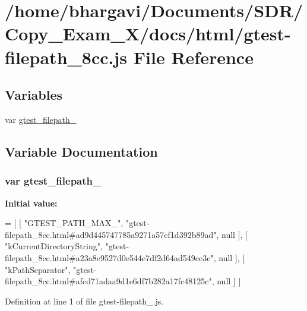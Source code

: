 \hypertarget{gtest-filepath__8cc_8js}{}\section{/home/bhargavi/\+Documents/\+S\+D\+R/\+Copy\+\_\+\+Exam\+\_\+X/docs/html/gtest-\/filepath\+\_\+8cc.js File Reference}
\label{gtest-filepath__8cc_8js}
\subsection*{Variables}
\begin{DoxyCompactItemize}
\item 
var \hyperlink{gtest-filepath__8cc_8js_adc99b293547c19d57955ad8b8722500a}{gtest\+\_\+filepath\+\_}
\end{DoxyCompactItemize}


\subsection{Variable Documentation}
\subsubsection[{\texorpdfstring{gtest\+\_\+filepath\+\_\+8cc}{gtest_filepath_8cc}}]{\setlength{\rightskip}{0pt plus 5cm}var gtest\+\_\+filepath\+\_}\hypertarget{gtest-filepath__8cc_8js_adc99b293547c19d57955ad8b8722500a}{}\label{gtest-filepath__8cc_8js_adc99b293547c19d57955ad8b8722500a}
{\bfseries Initial value\+:}
\begin{DoxyCode}
=
[
    [ \textcolor{stringliteral}{"GTEST\_PATH\_MAX\_"}, \textcolor{stringliteral}{"gtest-filepath\_8cc.html#ad9d445747785a9271a57cf1d392b89ad"}, null ],
    [ \textcolor{stringliteral}{"kCurrentDirectoryString"}, \textcolor{stringliteral}{"gtest-filepath\_8cc.html#a23a8e9527d0e544e7df2d64ad549ce3e"}, null ],
    [ \textcolor{stringliteral}{"kPathSeparator"}, \textcolor{stringliteral}{"gtest-filepath\_8cc.html#afcd71adaa9d1e6df7b282a17fc48125c"}, null ]
]
\end{DoxyCode}


Definition at line 1 of file gtest-\/filepath\+\_.\+js.

